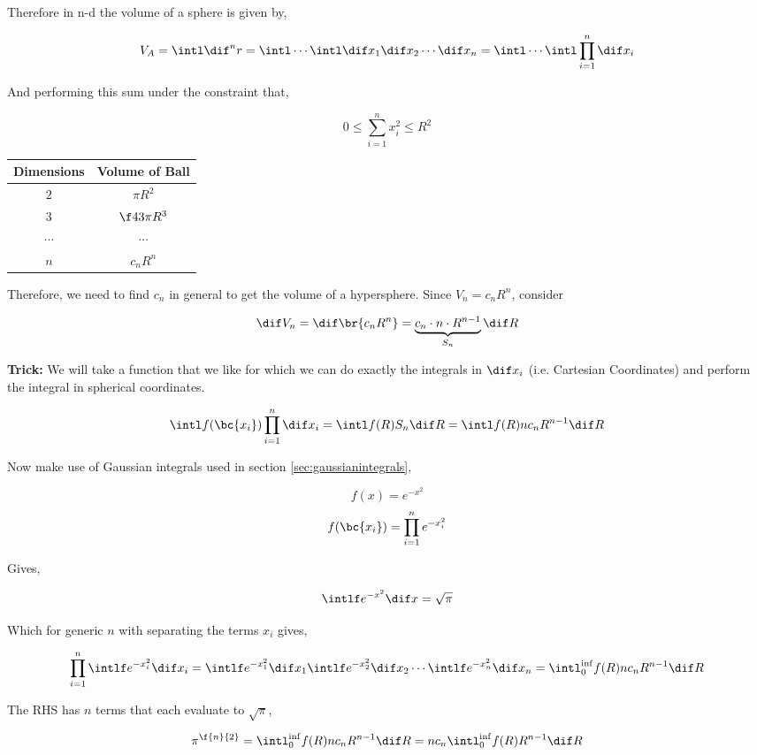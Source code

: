 \documentclass{article}
\begin{document}
Therefore in n-d the volume of a sphere is given by,

\[ V_A = \intl \dif^n r = \intl \cdots \intl \dif x_1 \dif x_2 \cdots \dif x_n = \intl \cdots \intl \prod_{i=1}^{n} \dif x_i \]

And performing this sum under the constraint that,

\[ 0 \leq \sum_{i=1}^{n} x_i^2 \leq R^2 \]

\begin{center}
\begin{tabular}{|c|c|}
        \hline
        Dimensions & Volume of Ball \\
        \hline
        $2$ & $\pi R^2$ \\
        $3$ & $\f43 \pi R^3$ \\
        $\cdots$ & $\cdots$ \\
        $n$ & $c_n R^n$ \\
        \hline
\end{tabular}
\end{center}

Therefore, we need to find $c_n$ in general to get the volume of a hypersphere. Since $V_n = c_n R^n$, consider

\[ \dif V_n = \dif \br{c_n R^n} = \underbrace{c_n \cdot n \cdot R^{n-1}}_{S_n} \dif R \]

\textbf{Trick:} We will take a function that we like for which we can do exactly the integrals in $\dif x_i$ (i.e. Cartesian Coordinates) and perform the integral in spherical coordinates.

\[ \intl f(\bc{x_i}) \prod_{i=1}^n \dif x_i = \intl f(R) S_n \dif R = \intl f(R) n c_n R^{n-1} \dif R \]

Now make use of Gaussian integrals used in section \ref{sec:gaussianintegrals},

\[ f(x) = e^{-x^2} \]
\[ f(\bc{x_i}) = \prod_{i=1}^{n} e^{-x_i^2} \]

Gives,

\[ \intlf e^{-x^2} \dif x = \sqrt{\pi} \]

Which for generic $n$ with separating the terms $x_i$ gives,

\[ \prod_{i=1}^{n} \intlf e^{-x_i^2} \dif x_i = \intlf e^{-x_1^2} \dif x_1 \intlf e^{-x_2^2} \dif x_2 \cdots \intlf e^{-x_n^2} \dif x_n = \intl_0^{\inf} f(R) n c_n R^{n-1} \dif R \]

The RHS has $n$ terms that each evaluate to $\sqrt{\pi}$,

\[ \pi^{\f{n}{2}} = \intl_0^{\inf} f(R) n c_n R^{n-1} \dif R = n c_n \intl_0^{\inf} f(R) R^{n-1} \dif R \]
\end{document}
